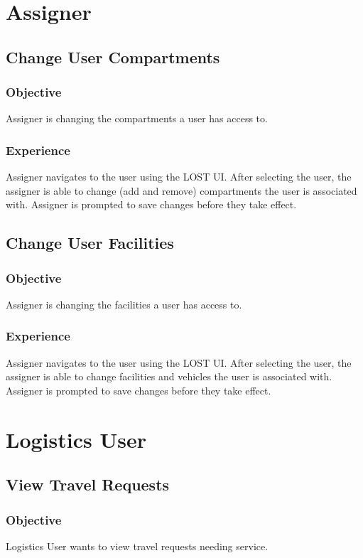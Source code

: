 \section*{Assigner}
\subsection*{Change User Compartments}
\subsubsection*{Objective}
Assigner is changing the compartments a user has access to.
\subsubsection*{Experience}
Assigner navigates to the user using the LOST UI. After selecting the user, the assigner is able to change (add and remove) compartments the user is associated with. Assigner is prompted to save changes before they take effect.

\subsection*{Change User Facilities}
\subsubsection*{Objective}
Assigner is changing the facilities a user has access to.
\subsubsection*{Experience}
Assigner navigates to the user using the LOST UI. After selecting the user, the assigner is able to change facilities and vehicles the user is associated with. Assigner is prompted to save changes before they take effect.


\section*{Logistics User}
\subsection*{View Travel Requests}
\subsubsection*{Objective}
Logistics User wants to view travel requests needing service.
